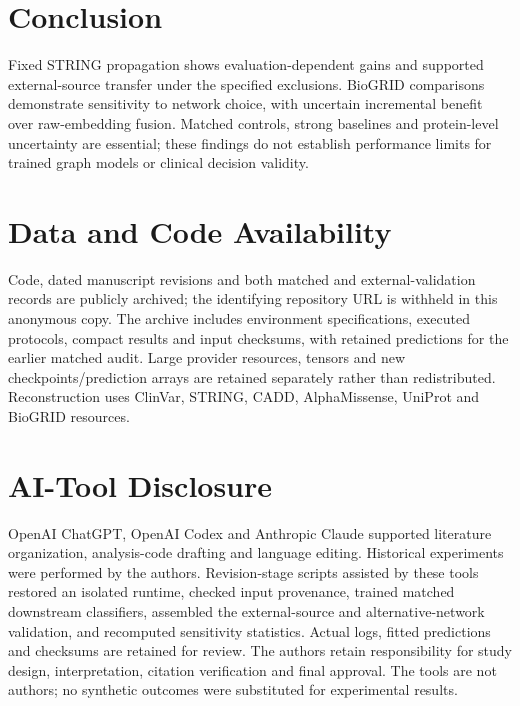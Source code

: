 \documentclass[conference]{IEEEtran}
\begin{document}
\section{Conclusion}
Fixed STRING propagation shows evaluation-dependent gains and supported external-source transfer under the specified exclusions. BioGRID comparisons demonstrate sensitivity to network choice, with uncertain incremental benefit over raw-embedding fusion. Matched controls, strong baselines and protein-level uncertainty are essential; these findings do not establish performance limits for trained graph models or clinical decision validity.

\section*{Data and Code Availability}

Code, dated manuscript revisions and both matched and external-validation records are publicly archived; the identifying repository URL is withheld in this anonymous copy. The archive includes environment specifications, executed protocols, compact results and input checksums, with retained predictions for the earlier matched audit. Large provider resources, tensors and new checkpoints/prediction arrays are retained separately rather than redistributed. Reconstruction uses ClinVar, STRING, CADD, AlphaMissense, UniProt and BioGRID resources.

\section*{AI-Tool Disclosure}

OpenAI ChatGPT, OpenAI Codex and Anthropic Claude supported literature organization, analysis-code drafting and language editing. Historical experiments were performed by the authors. Revision-stage scripts assisted by these tools restored an isolated runtime, checked input provenance, trained matched downstream classifiers, assembled the external-source and alternative-network validation, and recomputed sensitivity statistics. Actual logs, fitted predictions and checksums are retained for review. The authors retain responsibility for study design, interpretation, citation verification and final approval. The tools are not authors; no synthetic outcomes were substituted for experimental results.
\end{document}
